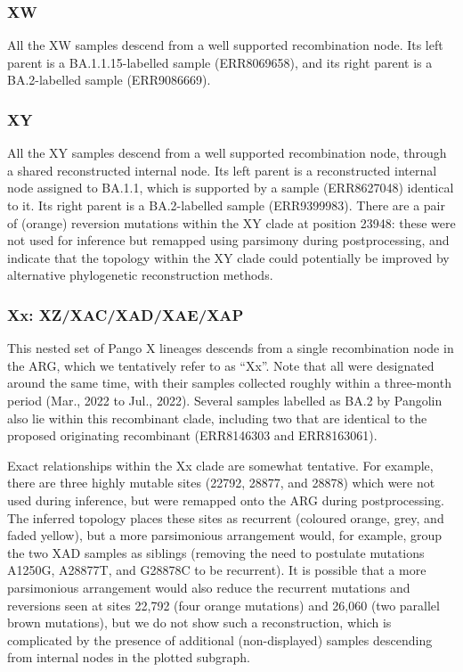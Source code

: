 \documentclass[12pt]{article}
\begin{document}

\subsubsection{XW}
\label{sec:dd_xw}

All the XW samples descend from a well supported recombination node.
Its left parent is a BA.1.1.15-labelled sample (ERR8069658), and
its right parent is a BA.2-labelled sample (ERR9086669).

\subsubsection{XY}
\label{sec:dd_xy}

All the XY samples descend from a well supported recombination node,
through a shared reconstructed internal node.
Its left parent is a reconstructed internal node assigned to BA.1.1,
which is supported by a sample (ERR8627048) identical to it.
Its right parent is a BA.2-labelled sample (ERR9399983).
There are a pair of (orange) reversion mutations
within the XY clade at position 23948:
these were not used for inference
but remapped using parsimony during postprocessing, and
indicate that the topology within the XY clade
could potentially be improved
by alternative phylogenetic reconstruction methods.

\subsubsection{Xx: XZ/XAC/XAD/XAE/XAP}
\label{sec:dd_xx}

This nested set of Pango X lineages descends
from a single recombination node in the ARG,
which we tentatively refer to as ``Xx''.
Note that all were designated around the same time,
with their samples collected
roughly within a three-month period (Mar., 2022 to Jul., 2022).
Several samples labelled as BA.2 by Pangolin also lie
within this recombinant clade,
including two that are identical
to the proposed originating recombinant (ERR8146303 and ERR8163061).

Exact relationships within the Xx clade are somewhat tentative.
For example, there are three highly mutable sites (22792, 28877, and 28878)
which were not used during inference,
but were remapped onto the ARG during postprocessing.
The inferred topology places these sites
as recurrent (coloured orange, grey, and faded yellow),
but a more parsimonious arrangement would,
for example, group the two XAD samples as siblings
(removing the need to postulate mutations
A1250G, A28877T, and G28878C to be recurrent).
It is possible that a more parsimonious arrangement would also
reduce the recurrent mutations and reversions seen at
sites 22,792 (four orange mutations) and
26,060 (two parallel brown mutations),
but we do not show such a reconstruction,
which is complicated by the presence of
additional (non-displayed) samples descending from
internal nodes in the plotted subgraph.
\end{document}
